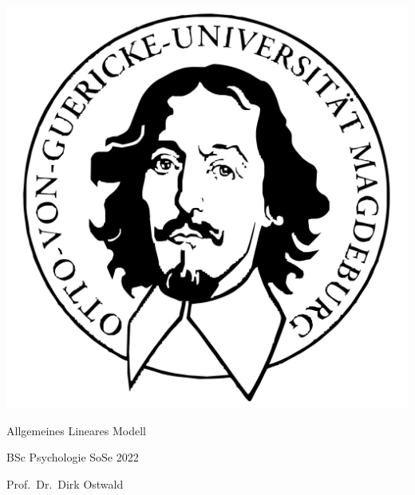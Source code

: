\documentclass[
  8pt,
  ignorenonframetext,
]{beamer}
\author{}
\date{\vspace{-2.5em}}
\begin{document}
\begin{frame}[plain]{}
\protect\hypertarget{section}{}
\center

\begin{center}\includegraphics[width=0.2\linewidth]{12_Abbildungen/alm_12_otto} \end{center}

\vspace{2mm}

\huge

Allgemeines Lineares Modell \vspace{6mm}

\large

BSc Psychologie SoSe 2022

\vspace{6mm}
\normalsize

Prof.~Dr.~Dirk Ostwald
\end{frame}
\end{document}

